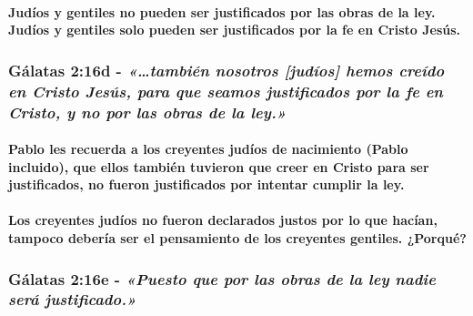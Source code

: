 \documentclass[11a pt,twoside]{article}
\newcommand{\scripture}[1]{%
  {\fontsize{12pt}{16pt}\selectfont\ScriptureFont\itshape #1}%
}
\let\oldsubsubsection\subsubsection
\renewcommand{\subsubsection}{\needspace{4\baselineskip}\oldsubsubsection}
\let\oldparagraph\paragraph
\renewcommand{\paragraph}{\needspace{3\baselineskip}\oldparagraph}
\begin{document}
\paragraph{Judíos y gentiles no pueden ser justificados por las obras de
la ley. Judíos y gentiles solo pueden ser justificados por la fe en
Cristo
Jesús.}\label{juduxedos-y-gentiles-no-pueden-ser-justificados-por-las-obras-de-la-ley.-juduxedos-y-gentiles-solo-pueden-ser-justificados-por-la-fe-en-cristo-jesuxfas.}

\subsubsection{\texorpdfstring{Gálatas 2:16d -
\scripture{«…también nosotros [judíos] hemos creído en Cristo Jesús, para que seamos justificados por la fe en Cristo, y no por las obras de la ley.»}}{Gálatas 2:16d - }}\label{guxe1latas-216d---tambiuxe9n-nosotros-juduxedos-hemos-creuxeddo-en-cristo-jesuxfas-para-que-seamos-justificados-por-la-fe-en-cristo-y-no-por-las-obras-de-la-ley.}

\paragraph{Pablo les recuerda a los creyentes judíos de nacimiento
(Pablo incluido), que ellos también tuvieron que creer en Cristo para
ser justificados, no fueron justificados por intentar cumplir la
ley.}\label{pablo-les-recuerda-a-los-creyentes-juduxedos-de-nacimiento-pablo-incluido-que-ellos-tambiuxe9n-tuvieron-que-creer-en-cristo-para-ser-justificados-no-fueron-justificados-por-intentar-cumplir-la-ley.}

\paragraph{Los creyentes judíos no fueron declarados justos por lo que
hacían, tampoco debería ser el pensamiento de los creyentes gentiles.
¿Porqué?}\label{los-creyentes-juduxedos-no-fueron-declarados-justos-por-lo-que-hacuxedan-tampoco-deberuxeda-ser-el-pensamiento-de-los-creyentes-gentiles.-porquuxe9}

\subsubsection{\texorpdfstring{Gálatas 2:16e -
\scripture{«Puesto que por las obras de la ley nadie será justificado.»}}{Gálatas 2:16e - }}\label{guxe1latas-216e---puesto-que-por-las-obras-de-la-ley-nadie-seruxe1-justificado.}
\end{document}
